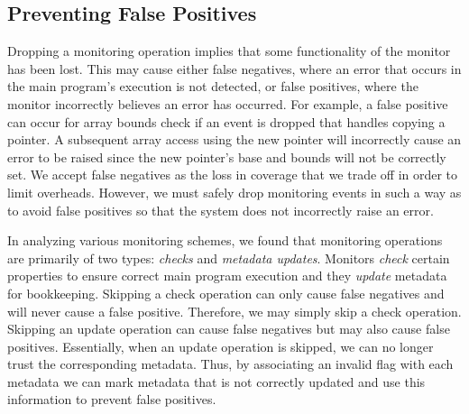 
\subsection{Preventing False Positives}
\label{sec:drop.false_positives}

Dropping a monitoring operation implies that some functionality of the monitor
has been lost. This may cause either false negatives, where an error that
occurs in the main program's execution is not detected, or false positives,
where the monitor incorrectly believes an error has occurred. 
For example, a false positive can occur for array bounds check if an event is
dropped that handles copying a pointer. A subsequent array access using the new
pointer will incorrectly cause an error to be raised since the new pointer's
base and bounds will not be correctly set.
We
accept false negatives as the loss in coverage that we trade off in order to
limit overheads.  However, we must safely drop monitoring events in such a way
as to avoid false positives so that the system does not incorrectly raise an
error.

In analyzing various monitoring schemes, we found that monitoring operations
are primarily of two types: \emph{checks} and \emph{metadata updates}. Monitors
\emph{check} certain properties to ensure correct main program execution and
they \emph{update} metadata for bookkeeping. Skipping a check operation can
only cause false negatives and will never cause a false positive. Therefore, we
may simply skip a check operation. Skipping an update operation can cause false
negatives but may also cause false positives. Essentially, when an update
operation is skipped, we can no longer trust the corresponding metadata.  Thus,
by associating an invalid flag with each metadata we can mark metadata that is
not correctly updated and use this information to prevent false positives.

